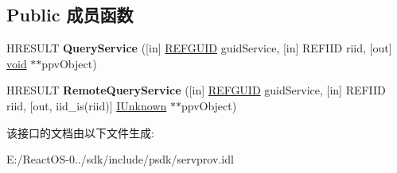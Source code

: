 \subsection*{Public 成员函数}
\begin{DoxyCompactItemize}
\item 
\mbox{\label{interface_i_service_provider_a92e5de28c8c40b043ce82af943261cfe}} 
H\+R\+E\+S\+U\+LT {\bfseries Query\+Service} (\mbox{[}in\mbox{]} \hyperlink{struct___g_u_i_d}{R\+E\+F\+G\+U\+ID} guid\+Service, \mbox{[}in\mbox{]} R\+E\+F\+I\+ID riid, \mbox{[}out\mbox{]} \hyperlink{interfacevoid}{void} $\ast$$\ast$ppv\+Object)
\item 
\mbox{\label{interface_i_service_provider_a09ad94a8ca351236852d4272fc69829b}} 
H\+R\+E\+S\+U\+LT {\bfseries Remote\+Query\+Service} (\mbox{[}in\mbox{]} \hyperlink{struct___g_u_i_d}{R\+E\+F\+G\+U\+ID} guid\+Service, \mbox{[}in\mbox{]} R\+E\+F\+I\+ID riid, \mbox{[}out, iid\+\_\+is(riid)\mbox{]} \hyperlink{interface_i_unknown}{I\+Unknown} $\ast$$\ast$ppv\+Object)
\end{DoxyCompactItemize}


该接口的文档由以下文件生成\+:\begin{DoxyCompactItemize}
\item 
E\+:/\+React\+O\+S-\/0../sdk/include/psdk/servprov.\+idl\end{DoxyCompactItemize}
